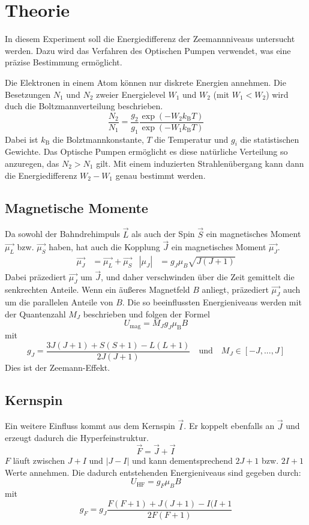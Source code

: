 \section{Theorie}
\label{sec:Theorie}
In diesem Experiment soll die Energiedifferenz der Zeemannniveaus untersucht werden. Dazu wird das Verfahren des Optischen Pumpen verwendet, was eine präzise Bestimmung ermöglicht.

Die Elektronen in einem Atom können nur diskrete Energien annehmen. Die Besetzungen $N_1$ und $N_2$  zweier Energielevel $W_1$ und $W_2$ (mit $W_1<W_2$) wird duch die Boltzmannverteilung beschrieben.
\begin{equation}
	\frac{N_2}{N_1}=\frac{g_2}{g_1}\frac{\exp(-W_2k_\mathrm{B}T)}{\exp(-W_1k_\mathrm{B}T)}
	\label{eqn:Bolztmann}
\end{equation}
Dabei ist $k_\mathrm{B}$ die Bolztmannkonstante, $T$ die Temperatur und $g_i$ die statistischen Gewichte. Das Optische Pumpen ermöglicht es diese natürliche Verteilung so anzuregen, das $N_2 > N_1$ gilt. Mit einem induzierten Strahlenübergang kann dann die Energiedifferenz $W_2-W_1$ genau bestimmt werden.
\subsection{Magnetische Momente}
Da sowohl der Bahndrehimpuls $\vec{L}$ als auch der Spin $\vec{S}$ ein magnetisches Moment $\vec{\mu_L}$ bzw. $\vec{\mu_S}$ haben, hat auch die Kopplung $\vec{J}$ ein magnetisches Moment $\vec{\mu_J}$.
\begin{align}
	\vec{\mu_J}&=\vec{\mu_L} +\vec{\mu_S} & \left| \mu_J \right|&=g_J\mu_B\sqrt{J(J+1)}
\end{align}
Dabei präzediert $\vec{\mu_J}$ um $\vec{J}$, und daher verschwinden über die Zeit gemittelt die senkrechten Anteile.
Wenn ein äußeres Magnetfeld $B$ anliegt, präzediert $\vec{\mu_J}$ auch um die parallelen Anteile von $B$. Die so beeinflussten Energieniveaus werden mit der Quantenzahl $M_J$ beschrieben und folgen der Formel
\begin{equation}
	U_\mathrm{mag} = M_J g_J \mu_\mathrm{B}B
\end{equation}
mit
\begin{equation}
	g_J=\frac{3J(J+1)+S(S+1)-L(L+1)}{2J(J+1)} \quad \text{und}\quad M_J \in [-J,...,J]
\end{equation}
Dies ist der Zeemann-Effekt.
\subsection{Kernspin}
Ein weitere Einfluss kommt aus dem Kernspin $\vec{I}$. Er koppelt ebenfalls an $\vec{J}$ und erzeugt dadurch die Hyperfeinstruktur.
\begin{equation}
	\vec{F}=\vec{J} +\vec{I}
\end{equation}
$F$ läuft zwischen $J+I$ und $|J-I|$ und kann dementsprechend $2J+1$ bzw. $2I+1$ Werte annehmen. Die dadurch entstehenden Energieniveaus sind gegeben durch:
\begin{equation}
	U_\mathrm{HF}=g_F\mu_BB
	\label{eqn:zeemann}
\end{equation}
mit
\begin{equation}
	g_F=g_J\frac{F(F+1)+J(J+1)-I(I+1}{2F(F+1)}
	\label{eqn:g_F}
\end{equation}
